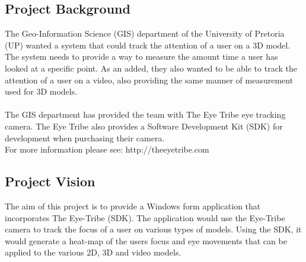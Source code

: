 \subsection{Project Background}
The Geo-Information Science (GIS) department of the University of Pretoria (UP) wanted a system that could track the attention of a user on a 3D model. The system needs to provide a way to measure the amount time a user has looked at a specific point. As an added, they also wanted to be able to track the attention of a user on a video, also providing the same manner of measurement used for 3D models.\\
\\
The GIS department has provided the team with The Eye Tribe eye tracking camera. The Eye Tribe also provides a Software Development Kit (SDK) for development when purchasing their camera.\\
For more information please see: http://theeyetribe.com

\subsection{Project Vision}
The aim of this project is to provide a Windows form application that incorporates The Eye-Tribe (SDK). The application would use the Eye-Tribe camera to track the focus of a user on various types of  models. Using the SDK, it would generate a heat-map of the users focus and eye movements that can be applied to the various 2D, 3D and video models.
